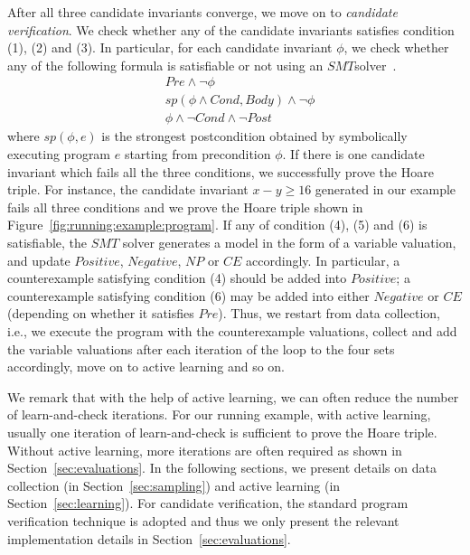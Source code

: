 After all three candidate invariants converge, we move on to \emph{candidate verification}. 
We check whether any of the candidate invariants satisfies condition (1), (2) and (3). 
In particular, for each candidate invariant $\phi$, we check whether any of the following formula is satisfiable or not using an $\mathit{SMT}$solver~\cite{barrett2009satisfiability,de2008z3}.
\begin{align}
    & \mathit{Pre} \land \neg \phi \label{check:inv:pre} \\
     & sp(\phi \land \mathit{Cond}, \mathit{Body}) \land \neg \phi \label{check:inv:loop} \\
    & \phi \land \neg \mathit{Cond} \land \neg \mathit{Post} \label{check:inv:post}
\end{align}
where $\mathit{sp}(\phi,e)$ is the strongest postcondition obtained by
symbolically executing program $e$
starting from precondition $\phi$.
If there is one candidate invariant which fails all the three conditions, we successfully prove the Hoare triple. 
For instance, the candidate invariant $\mathit{x - y \geq 16}$ generated in our example fails all three conditions and we prove the Hoare triple shown in Figure~\ref{fig:running:example:program}. 
If any of condition (4), (5) and (6) is satisfiable, the $\mathit{SMT}$ solver generates a model in the form of a variable valuation, 
and update $\mathit{Positive}$, $\mathit{Negative}$, $\mathit{NP}$ or $\mathit{CE}$ accordingly. %
In particular, a counterexample satisfying condition (4) should be added into $\mathit{Positive}$; 
a counterexample satisfying condition (6) may be added into either $\mathit{Negative}$ or $\mathit{CE}$ (depending on whether it satisfies $\mathit{Pre}$). 
Thus, we restart from data collection, i.e., we execute the program with the counterexample valuations, 
collect and add the variable valuations after each iteration of the loop to the four sets accordingly, move on to active learning and so on.

We remark that with the help of active learning, we can often reduce the number of learn-and-check iterations. %
For our running example, with active learning, usually one iteration of learn-and-check is sufficient to prove the Hoare triple. 
Without active learning, more iterations are often required as shown in Section~\ref{sec:evaluations}. 
In the following sections, we present details on data collection (in Section~\ref{sec:sampling}) and active learning (in Section~\ref{sec:learning}). 
For candidate verification, the standard program verification technique is adopted and thus we only present the relevant implementation details in Section~\ref{sec:evaluations}.

